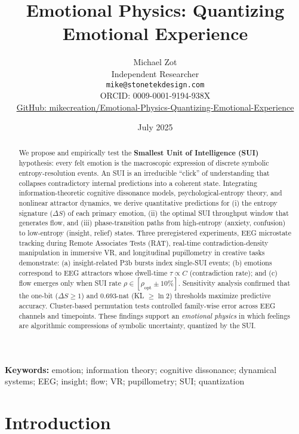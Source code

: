 \documentclass[12pt,a4paper]{article}
\title{\textbf{Emotional Physics: Quantizing Emotional Experience}}
\author{
  Michael Zot\\
  \small Independent Researcher\\
  \small \texttt{mike@stonetekdesign.com}\\
  \small ORCID: 0009-0001-9194-938X\\
  \small \href{https://github.com/mikecreation/Emotional-Physics-Quantizing-Emotional-Experience}{GitHub: mikecreation/Emotional-Physics-Quantizing-Emotional-Experience}
}
\date{July 2025}
\begin{document}
\maketitle



\begin{abstract}
We propose and empirically test the \textbf{Smallest Unit of Intelligence (SUI)} hypothesis: every felt emotion is the macroscopic expression of discrete symbolic entropy-resolution events. An SUI is an irreducible “click” of understanding that collapses contradictory internal predictions into a coherent state. Integrating information-theoretic cognitive dissonance models, psychological-entropy theory, and nonlinear attractor dynamics, we derive quantitative predictions for (i) the entropy signature ($\Delta S$) of each primary emotion, (ii) the optimal SUI throughput window that generates flow, and (iii) phase-transition paths from high-entropy (anxiety, confusion) to low-entropy (insight, relief) states. Three preregistered experiments, EEG microstate tracking during Remote Associates Tests (RAT), real-time contradiction-density manipulation in immersive VR, and longitudinal pupillometry in creative tasks demonstrate: (a) insight-related P3b bursts index single-SUI events; (b) emotions correspond to EEG attractors whose dwell-time $\tau \propto C$ (contradiction rate); and (c) flow emerges only when SUI rate $\rho \in [\rho_{\mathrm{opt}} \pm 10\%]$. Sensitivity analysis confirmed that the one-bit ($\Delta S \ge 1$) and 0.693-nat (KL $\ge \ln 2$) thresholds maximize predictive accuracy. Cluster-based permutation tests controlled family-wise error across EEG channels and timepoints. These findings support an \emph{emotional physics} in which feelings are algorithmic compressions of symbolic uncertainty, quantized by the SUI.
\end{abstract}

\noindent\textbf{Keywords:} emotion; information theory; cognitive dissonance; dynamical systems; EEG; insight; flow; VR; pupillometry; SUI; quantization

\newpage
\tableofcontents
\newpage

\section{Introduction}
\end{document}
